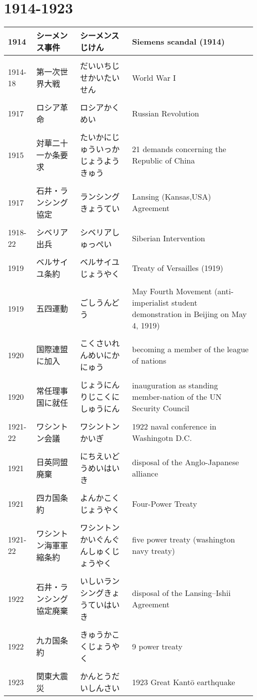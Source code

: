 \documentclass{article}
\begin{document}
\section{1914-1923}
\begin{tabular}{p{1.8cm} | p{3.4cm} | p{5.91cm} | p{7.0cm}}
1914 & シーメンス事件 & シーメンスじけん & Siemens scandal (1914) \\ \hline \\[-1em]
1914-18 & 第一次世界大戦 & だいいちじせかいたいせん & World War I \\ \hline \\[-1em]
1917 & ロシア革命 & ロシアかくめい & Russian Revolution \\ \hline \\[-1em]
1915 & 対華二十一か条要求 & たいかにじゅういっかじょうようきゅう & 21 demands concerning the Republic of China \\ \hline \\[-1em]
1917 & 石井・ランシング協定 & ランシングきょうてい & Lansing (Kansas,USA) Agreement \\ \hline \\[-1em]
1918-22 & シベリア出兵 & シベリアしゅっぺい & Siberian Intervention​ \\ \hline \\[-1em]
1919 & ベルサイユ条約 & ベルサイユじょうやく & Treaty of Versailles (1919)​ \\ \hline \\[-1em]
1919 & 五四運動 &  ごしうんどう & May Fourth Movement (anti-imperialist student demonstration in Beijing on May 4, 1919) \\ \hline \\[-1em]
1920 & 国際連盟に加入 & こくさいれんめいにかにゅう & becoming a member of the league of nations \\ \hline \\[-1em]
1920 & 常任理事国に就任 & じょうにんりじこくにしゅうにん & inauguration as standing member-nation of the UN Security Council \\ \hline \\[-1em]
1921-22 & ワシントン会議 & ワシントンかいぎ & 1922 naval conference in Washingotn D.C. \\ \hline \\[-1em]
1921 & 日英同盟廃棄& にちえいどうめいはいき & disposal of the Anglo-Japanese alliance \\ \hline \\[-1em]
1921 & 四カ国条約 & よんかこくじょうやく & Four-Power Treaty​ \\ \hline \\[-1em]
1921-22 & ワシントン海軍軍縮条約 & ワシントンかいぐんぐんしゅくじょうやく & five power treaty (washington navy treaty) \\ \hline \\[-1em]
1922 & 石井・ランシング協定廃棄 & いしいランシングきょうていはいき & disposal of the Lansing–Ishii Agreement \\ \hline \\[-1em]
1922 & 九カ国条約 & きゅうかこくじょうやく & 9 power treaty \\ \hline \\[-1em]
1923 & 関東大震災 &  かんとうだいしんさい & 1923 Great Kantō earthquake

\end{tabular}
\end{document}
